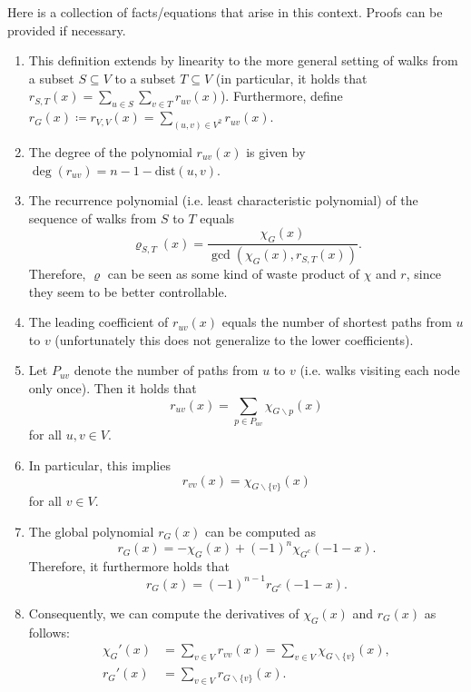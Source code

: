\documentclass[a4paper,12pt]{article}
\begin{document}
Here is a collection of facts/equations that arise in this context. Proofs can be provided if necessary.
\begin{enumerate}

\item 
This definition extends by linearity to the more general setting of walks from a subset $S\subseteq V$ to a subset $T\subseteq V$ (in particular, it holds that $r_{S,T}(x) = \sum_{u\in S}\sum_{v\in T}r_{uv}(x)$). Furthermore, define $r_G(x) \coloneqq r_{V,V}(x) = \sum_{(u,v)\in V^2}r_{uv}(x)$.

\item 
The degree of the polynomial $r_{uv}(x)$ is given by $\deg(r_{uv}) = n - 1 - \textrm{dist}(u,v)$.

\item
The recurrence polynomial (i.e. least characteristic polynomial) of the sequence of walks from $S$ to $T$ equals
$$
\varrho_{S,T}(x) = \frac{\chi_G(x)}{\gcd (\chi_G(x),r_{S,T}(x))}.
$$
Therefore, $\varrho$ can be seen as some kind of waste product of $\chi$ and $r$, since they seem to be better controllable.

\item 
The leading coefficient of $r_{uv}(x)$ equals the number of shortest paths from $u$ to $v$ (unfortunately this does not generalize to the lower coefficients).

\item 
Let $P_{uv}$ denote the number of paths from $u$ to $v$ (i.e. walks visiting each node only once). Then it holds that
$$
r_{uv}(x) = \sum_{p \in P_{uv}} \chi_{G \backslash p} (x)
$$
for all $u,v \in V$.

\item 
In particular, this implies
$$
r_{vv}(x) = \chi_{G \backslash\{v\}}(x)
$$
for all $v \in V$.

\item \label{chiGc}
The global polynomial $r_G(x)$ can be computed as
$$
r_G(x) = -\chi_G(x) + (-1)^n \chi_{G^c}(-1-x).
$$
Therefore, it furthermore holds that
$$
r_G(x) = (-1)^{n-1} r_{G^c}(-1-x).
$$

\item
Consequently, we can compute the derivatives of $\chi_G(x)$ and $r_G(x)$ as follows:
\begin{align*}
\chi_G'(x) &= \sum_{v\in V}r_{vv}(x) = \sum_{v\in V} \chi_{G \backslash\{v\}}(x),\\
r_G'(x) &= \sum_{v\in V} r_{G \backslash\{v\}}(x).
\end{align*}


\end{enumerate}
\end{document}
